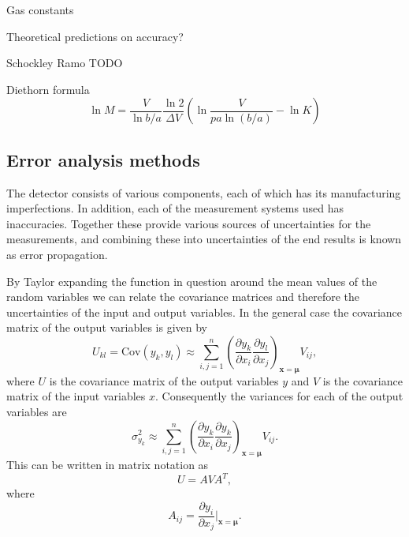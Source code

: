\documentclass[a4paper]{article}
\begin{document}
Gas constants \cite{wolff_measurement_1974}

Theoretical predictions on accuracy?

Schockley \cite{shockley_currents_1938}
Ramo \cite{ramo_currents_1939}
TODO

Diethorn formula \cite[eq. 6.10]{knoll_radiation_2010}
\begin{equation}
\ln M = \frac{V}{\ln b/a} \frac{\ln 2}{\Delta V}
\left( \ln \frac{V}{pa \ln (b/a)} - \ln K \right)
\end{equation}


\subsection{Error analysis methods}
\label{error_analysis}
The detector consists of various components, each of which has its manufacturing imperfections.
In addition, each of the measurement systems used has inaccuracies.
Together these provide various sources of uncertainties for the measurements, and combining these into uncertainties of the end results is known as error propagation.

By Taylor expanding the function in question around the mean values of the random variables we can relate the covariance matrices and therefore the uncertainties of the input and output variables.
In the general case the covariance matrix of the output variables is given by
\begin{equation}
U_{kl}
= \mathrm{Cov}(y_k, y_l)
\approx \sum_{i,j=1}^n \left( \frac{\partial y_k}{\partial x_i} \frac{\partial y_l}{\partial x_j} \right)_{\mathbf{x}=\mathbf{\mu}} V_{ij},
\end{equation}
where $U$ is the covariance matrix of the output variables $y$ and $V$ is the covariance matrix of the input variables $x$.
Consequently the variances for each of the output variables are
\begin{equation}
\sigma_{y_k}^2 \approx \sum_{i,j=1}^n \left( \frac{\partial y_k}{\partial x_i} \frac{\partial y_k}{\partial x_j} \right)_{\mathbf{x}=\mathbf{\mu}} V_{ij}.
\end{equation}
This can be written in matrix notation as
\begin{equation}
U = AVA^T,
\end{equation}
where
\begin{equation}
A_{ij} = \frac{\partial y_i}{\partial x_j} \vert_{\boldsymbol{x}=\boldsymbol{\mu}}.
\end{equation}
\cite[p. 20--22]{cowan_statistical_1998}
\end{document}
